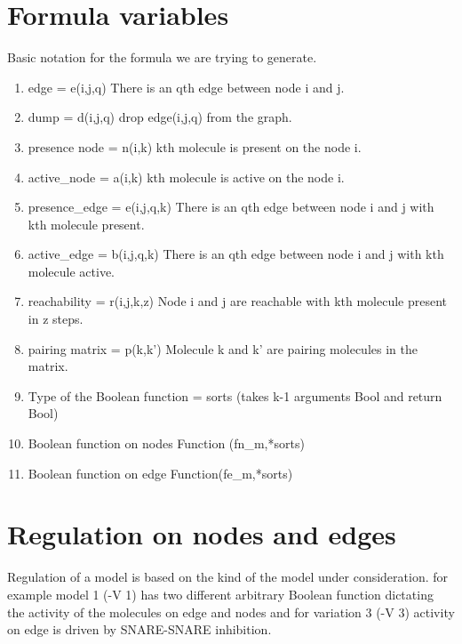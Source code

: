 \documentclass{llncs}
\begin{document}
\section{Formula variables}
Basic notation for the formula we are trying to generate.
\begin{enumerate}
\item edge = e(i,j,q)
      There is an qth edge between node i and j.
      
\item dump = d(i,j,q)
       drop edge(i,j,q) from the graph. 
       
\item presence node = n(i,k) 
	  kth molecule is present on the node i.
      
\item active\_node = a(i,k) 
      kth molecule is active on the node i.
      
\item presence\_edge = e(i,j,q,k)
      There is an qth edge between node i and j with kth molecule present.

\item active\_edge = b(i,j,q,k)
      There is an qth edge between node i and j with kth molecule active.

\item reachability = r(i,j,k,z)
      Node i and j are reachable with kth molecule present in z steps.

\item pairing matrix = p(k,k')
      Molecule k and k' are pairing molecules in the matrix.

\item Type of the Boolean function = sorts (takes k-1 arguments Bool and return Bool) 
\item Boolean function on nodes Function (fn\_{m},*sorts) 

\item Boolean function on edge Function(fe\_{m},*sorts)

\end{enumerate}

\section{Regulation on nodes and edges}
Regulation of a model is based on the kind of the model under consideration. for example model 1 (-V 1) has two different arbitrary Boolean function dictating the activity of the molecules on edge and nodes and for variation 3 (-V 3) activity on edge is driven by SNARE-SNARE inhibition.  
\end{document}
